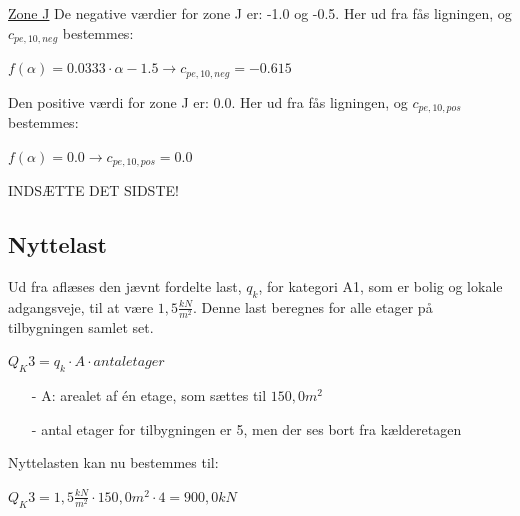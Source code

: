 \underline{Zone J}
\newline
De negative værdier for zone J er: -1.0 og -0.5. Her ud fra fås ligningen, og $c_{pe,10,neg}$ bestemmes:
\begin{center}
	$f(\alpha)=0.0333\cdot \alpha - 1.5 \to c_{pe,10,neg}=-0.615$
\end{center}
Den positive værdi for zone J er: 0.0. Her ud fra fås ligningen, og $c_{pe,10,pos}$ bestemmes:
\begin{center}
	$f(\alpha)=0.0 \to c_{pe,10,pos}=0.0$
\end{center}
INDSÆTTE DET SIDSTE!

\subsection{Nyttelast}
Ud fra \citep[ tabel 6.2 kapitel 6.3.1.2]{EU91} aflæses den jævnt fordelte last, $q_k$, for kategori A1, som er bolig og lokale adgangsveje, til at være $1,5 \frac{kN}{m^2}$. Denne last beregnes for alle etager på tilbygningen samlet set.
\begin{center}
	$Q_K3=q_k\cdot A\cdot antal etager$
\end{center}
\begin{itemize}
	\item[-] A: arealet af én etage, som sættes til $150,0 m^2$
	\item[-] antal etager for tilbygningen er 5, men der ses bort fra kælderetagen
\end{itemize}
Nyttelasten kan nu bestemmes til:
\begin{center}
	$Q_K3=1,5 \frac{kN}{m^2}\cdot 150,0 m^2\cdot 4=900,0 kN$
\end{center}

